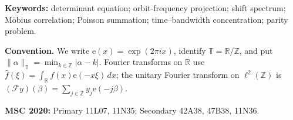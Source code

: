 \documentclass[11pt]{article}
\theoremstyle{definition}
\theoremstyle{remark}
\newcommand{\R}{\mathbb R}
\newcommand{\T}{\mathbb T}
\newcommand{\Z}{\mathbb Z}
\newcommand{\e}{\mathrm e}
\begin{document}
\noindent\textbf{Keywords:} determinant equation; orbit-frequency
projection; shift spectrum; M\"obius correlation; Poisson summation;
time--bandwidth concentration; parity problem.

\medskip
\noindent\textbf{Convention.}
We write \(\e(x)=\exp(2\pi i x)\), identify
\(\T=\R/\Z\), and put
\(\|\alpha\|_{\T}=\min_{k\in\Z}|\alpha-k|\).
Fourier transforms on \(\R\) use
\(\widehat f(\xi)=\int_{\R}f(x)\e(-x\xi)\,dx\); the unitary
Fourier transform on \(\ell^2(\Z)\) is
\((\mathscr Fy)(\beta)=\sum_{j\in\Z}y_j\e(-j\beta)\).

\medskip
\noindent\textbf{MSC 2020:} Primary 11L07, 11N35; Secondary 42A38,
47B38, 11N36.












\begingroup
\small
\raggedright
\setlength{\bibsep}{4pt plus 1pt minus 1pt}


\endgroup
\end{document}

